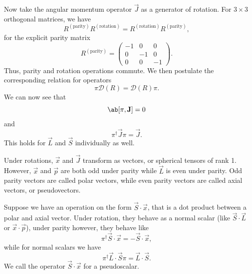Now take the angular momentum operator $\vec{J}$ as a generator of rotation. For $3\times 3$ orthogonal matrices, we have 
\begin{equation}
    R^{(\text{parity})} R^{(\text{rotation})} =  R^{(\text{rotation})} R^{(\text{parity})},
\end{equation}
for the explicit parity matrix
\begin{equation}
    R^{(\text{parity})} = 
    \begin{pmatrix}
        -1  & 0     & 0\\
        0   & -1    & 0\\
        0   & 0     & -1
    \end{pmatrix}.
\end{equation}
Thus, parity and rotation operations commute. We then postulate the corresponding relation for operators
\begin{equation}
    \pi \mathscr{D}(R) = \mathscr{D}(R)\pi.
\end{equation}
We can now see that 
\begin{equation}
    \comm{\pi}{\vec{J}} = 0
\end{equation}
and
\begin{equation}
    \pi^\dagger \vec{J} \pi = \vec{J}.
\end{equation}
This holds for $\vec{L}$ and $\vec{S}$ individually as well.

Under rotations, $\vec{x}$ and $\vec{J}$ transform as vectors, or spherical tensors of rank 1. However, $\vec{x}$ and $\vec{p}$ are both odd under parity while $\vec{L}$ is even under parity. Odd parity vectors are called polar vectors, while even parity vectors are called axial vectors, or pseudovectors.

Suppose we have an operation on the form $\vec{S}\cdot \vec{x}$, that is a dot product between a polar and axial vector. Under rotation, they behave as a normal scalar (like $\vec{S}\cdot\vec{L}$ or $\vec{x}\cdot\vec{p}$), under parity however, they behave like
\begin{equation}
    \pi^\dagger \vec{S}\cdot\vec{x} = - \vec{S}\cdot \vec{x},
\end{equation} 
while for normal scalars we have
\begin{equation}
    \pi^\dagger \vec{L}\cdot\vec{S}\pi = \vec{L}\cdot\vec{S}.
\end{equation}
We call the operator $\vec{S}\cdot\vec{x}$ for a pseudoscalar.

